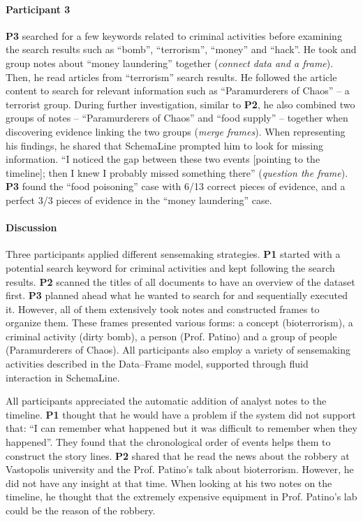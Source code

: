 \paragraph{Participant 3}
\textbf{P3} searched for a few keywords related to criminal activities before examining the search results such as ``bomb'', ``terrorism'', ``money'' and ``hack''. He took and group notes about ``money laundering'' together (\emph{connect data and a frame}). Then, he read articles from ``terrorism'' search results. He followed the article content to search for relevant information such as ``Paramurderers of Chaos'' -- a terrorist group. During further investigation, similar to \textbf{P2}, he also combined two groups of notes -- ``Paramurderers of Chaos'' and ``food supply'' -- together when discovering evidence linking the two groups (\emph{merge frames}). When representing his findings, he shared that SchemaLine prompted him to look for missing information. ``I noticed the gap between these two events [pointing to the timeline]; then I knew I probably missed something there'' (\emph{question the frame}). \textbf{P3} found the ``food poisoning'' case with 6/13 correct pieces of evidence, and a perfect 3/3 pieces of evidence in the ``money laundering'' case. 

\paragraph{Discussion}
Three participants applied different sensemaking strategies. \textbf{P1} started with a potential search keyword for criminal activities and kept following the search results. \textbf{P2} scanned the titles of all documents to have an overview of the dataset first. \textbf{P3} planned ahead what he wanted to search for and sequentially executed it. However, all of them extensively took notes and constructed frames to organize them. These frames presented various forms: a concept (bioterrorism), a criminal activity (dirty bomb), a person (Prof. Patino) and a group of people (Paramurderers of Chaos). All participants also employ a variety of sensemaking activities described in the Data--Frame model, supported through fluid interaction in SchemaLine.

All participants appreciated the automatic addition of analyst notes to the timeline. \textbf{P1} thought that he would have a problem if the system did not support that: ``I can remember what happened but it was difficult to remember when they happened''. They found that the chronological order of events helps them to construct the story lines. \textbf{P2} shared that he read the news about the robbery at Vastopolis university and the Prof. Patino's talk about bioterrorism. However, he did not have any insight at that time. When looking at his two notes on the timeline, he thought that the extremely expensive equipment in Prof. Patino's lab could be the reason of the robbery. 

